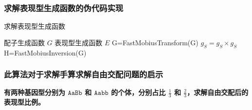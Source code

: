 \documentclass[12pt]{article} %
\begin{document}
\newpage

\subsubsection*{求解表现型生成函数的伪代码实现}

\begin{algorithm}
    \caption{求解表现型生成函数}
    \begin{algorithmic}[1]
        \Require 配子生成函数 $G$
        \Ensure 表现型生成函数 $E$
			\State G=FastMobiusTransform(G)
                \State $g_S=g_S \times g_S$
            \EndFor
			\State H=FastMobiusInversion(G)
            \State {}
        \EndFunction
    \end{algorithmic}
\end{algorithm}

\subsubsection*{此算法对于求解手算求解自由交配问题的启示}

\textbf{有两种基因型分别为 $\texttt{AaBb}$ 和 $\texttt{Aabb}$ 的个体，分别占比 $\frac{1}{3}$ 和 $\frac{2}{3}$，求解自由交配后的表现型比例。}
\end{document}
